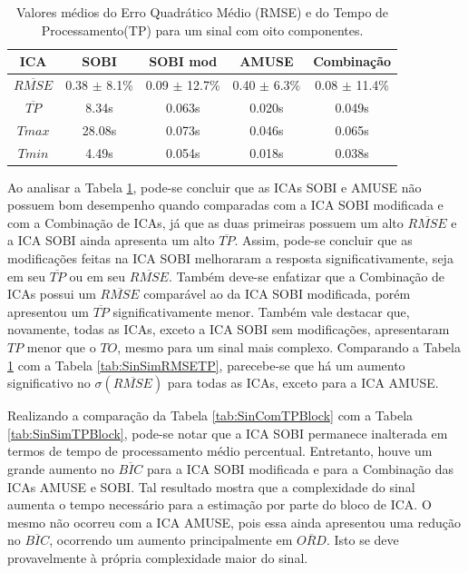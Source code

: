 \documentclass[a4paper,12pt]{monografia}
\theoremstyle{plain}
\theoremstyle{definition}
\theoremstyle{remark}
\begin{document}
\begin{table}[h]
    \begin{center}
    \caption{Valores médios do Erro Quadrático Médio (RMSE) e do Tempo de Processamento(TP) para um sinal com oito componentes.}
        \begin{tabular}{c|c c c c}
        \hline
        \textbf{ICA} & \textbf{SOBI} & \textbf{SOBI mod} & \textbf{AMUSE} & \textbf{Combinação}\\ \hline
        $\overline{RMSE}$   & 0.38 $\pm$ 8.1\% & 0.09 $\pm$ 12.7\% & 0.40 $\pm$ 6.3\% & 0.08 $\pm$ 11.4\%\\ \hline
        $\overline{TP}$    & 8.34s   & 0.063s   & 0.020s   & 0.049s  \\ \hline
        $Tmax$             & 28.08s  & 0.073s   & 0.046s   & 0.065s  \\ \hline
        $Tmin$             & 4.49s   & 0.054s   & 0.018s   & 0.038s  \\ \hline
        \end{tabular}
        \label{tab:SinComRMSETP}
    \end{center}
\end{table}

Ao analisar a Tabela \ref{tab:SinComRMSETP}, pode-se concluir que as ICAs SOBI e AMUSE não possuem bom desempenho quando comparadas com a ICA SOBI modificada e com a Combinação de ICAs, já que as duas primeiras possuem um alto $\overline{RMSE}$ e a ICA SOBI ainda apresenta um alto $\overline{TP}$. Assim, pode-se concluir que as modificações feitas na ICA SOBI melhoraram a resposta significativamente, seja em seu $\overline{TP}$ ou em seu $\overline{RMSE}$. Também deve-se enfatizar que a Combinação de ICAs possui um $\overline{RMSE}$ comparável ao da ICA SOBI modificada, porém apresentou um $\overline{TP}$ significativamente menor. Também vale destacar que, novamente, todas as ICAs, exceto a ICA SOBI sem modificações, apresentaram $TP$ menor que o $TO$, mesmo para um sinal mais complexo. Comparando a Tabela \ref{tab:SinComRMSETP}  com a Tabela \ref{tab:SinSimRMSETP}, parecebe-se que há um aumento significativo no $\sigma(\overline{RMSE})$ para todas as ICAs, exceto para a ICA AMUSE.

Realizando a comparação da Tabela \ref{tab:SinComTPBlock} com a Tabela \ref{tab:SinSimTPBlock}, pode-se notar que a ICA SOBI permanece inalterada em termos de tempo de processamento médio percentual. Entretanto, houve um grande aumento no $\overline{BIC}$ para a ICA SOBI modificada e para a Combinação das ICAs AMUSE e SOBI. Tal resultado mostra que a complexidade do sinal aumenta o tempo necessário para a estimação por parte do bloco de ICA. O mesmo não ocorreu com a ICA AMUSE, pois essa ainda apresentou uma redução no $\overline{BIC}$, ocorrendo um aumento principalmente em $\overline{ORD}$. Isto se deve provavelmente à própria complexidade maior do sinal.
\end{document}
